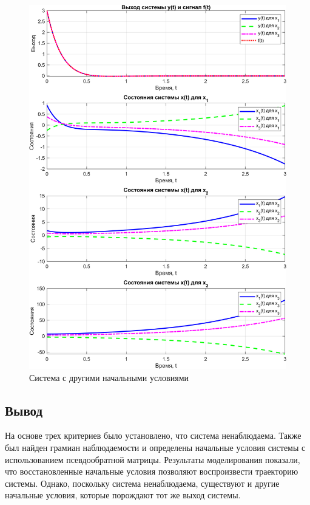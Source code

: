 \begin{figure}[H]
    \centering
    \includegraphics[width=1\textwidth]{figs/task_41.png}
    \caption{Система с другими начальными условиями}
    \label{fig:task41}
\end{figure}

\subsection{Вывод}

На основе трех критериев было установлено, что система ненаблюдаема. 
Также был найден грамиан наблюдаемости и определены начальные условия 
системы с использованием псевдообратной матрицы. Результаты моделирования 
показали, что восстановленные начальные условия позволяют воспроизвести 
траекторию системы. Однако, поскольку система ненаблюдаема, существуют и 
другие начальные условия, которые порождают тот же выход системы.



